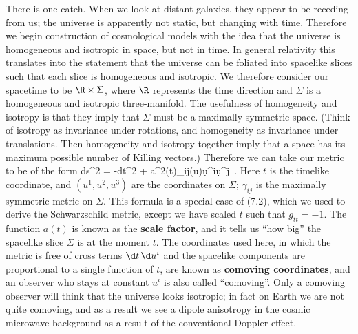 \documentclass[12pt]{article}
\begin{document}
There is one catch.  When we look at distant galaxies, they appear
to be receding from us; the universe is apparently not static, but
changing with time.  Therefore we begin construction of cosmological
models with the idea that the universe is homogeneous and isotropic
in space, but not in time.  In general relativity this translates into
the statement that the universe can be foliated into spacelike slices
such that each slice is homogeneous and isotropic.  
We therefore consider our spacetime to be $\R\times\Sigma$, where
$\R$ represents the time direction and $\Sigma$ is a homogeneous and
isotropic three-manifold.  The usefulness of homogeneity and 
isotropy is that they imply that $\Sigma$ must be a maximally
symmetric space.  (Think of isotropy as invariance under rotations,
and homogeneity as invariance under translations.  Then homogeneity
and isotropy together imply that a space has its maximum possible
number of Killing vectors.)  Therefore
we can take our metric to be of the form
\be
  ds^2 = -dt^2 + a^2(t)\gamma_{ij}(u)\d u^i\d u^j\ .\label{8.1}
\ee
Here $t$ is the timelike coordinate, and $(u^1, u^2, u^3)$ are the
coordinates on $\Sigma$; $\gamma_{ij}$ is the maximally symmetric
metric on $\Sigma$.  This formula is a special case of (7.2), which we
used to derive the Schwarzschild metric, except we have scaled $t$
such that $g_{tt}=-1$.  The function $a(t)$ is known as the 
{\bf scale factor}, and it tells us ``how big'' the spacelike
slice $\Sigma$ is at the moment $t$.  The coordinates used here,
in which the metric is free of cross terms $\d t\,\d u^i$ and the
spacelike components are proportional to a single function of $t$, are 
known as {\bf comoving coordinates}, and an observer who stays at constant
$u^i$ is also called ``comoving''.  Only a comoving observer will
think that the universe looks isotropic; in fact on Earth we are
not quite comoving, and as a result we see a dipole anisotropy in
the cosmic microwave background as a result of the conventional
Doppler effect.
\end{document}
